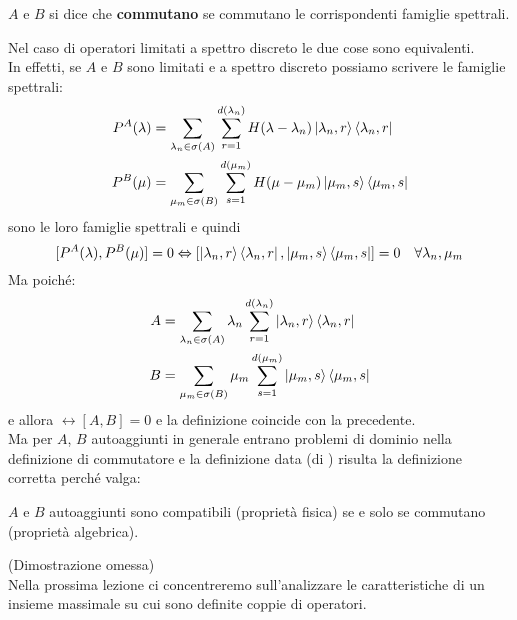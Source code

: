 \documentclass[../../FisicaTeorica.tex]{subfiles}
\begin{document}
\begin{dfn}
$A$ e $B$ si dice che \textbf{commutano} se commutano le corrispondenti famiglie spettrali. 
\end{dfn}
Nel caso di operatori limitati a spettro discreto le due cose sono equivalenti.\\
In effetti, se $A$ e $B$ sono limitati e a spettro discreto possiamo scrivere le famiglie spettrali:
\begin{align*}
P^A(\lambda) &= \sum_{\lambda_n \in \sigma(A)}\sum_{r=1}^{d(\lambda_n)}H(\lambda-\lambda_n)\ket{\lambda_n,r}\bra{\lambda_n, r}\\
P^B(\mu) &= \sum_{\mu_m \in \sigma(B)}\sum_{s=1}^{d(\mu_m)}H(\mu-\mu_m)\ket{\mu_m, s}\bra{\mu_m, s}
\end{align*}
sono le loro famiglie spettrali e quindi 
\[
[P^A(\lambda), P^B(\mu)]=0 \Leftrightarrow [\ket{\lambda_n,r}\bra{\lambda_n, r}, \ket{\mu_m, s}\bra{\mu_m, s}] = 0 \quad \forall \lambda_n, \mu_m
\]
Ma poiché:
\begin{align*}
A &= \sum_{\lambda_n \in \sigma(A)}\lambda_n \sum_{r=1}^{d(\lambda_n)}\ket{\lambda_n,r}\bra{\lambda_n,r}\\
B &= \sum_{\mu_m \in \sigma(B)} \mu_m \sum_{s=1}^{d(\mu_m)}\ket{\mu_m, s}\bra{\mu_m, s}
\end{align*}
e allora $\leftrightarrow [A,B]=0$ e la definizione coincide con la precedente.\\
Ma per $A$, $B$ autoaggiunti in generale entrano problemi di dominio nella definizione di commutatore e la definizione data (di ) risulta la definizione corretta  perché valga:
 \begin{thm}
 $A$ e $B$ autoaggiunti sono compatibili (proprietà fisica) se e solo se commutano (proprietà algebrica).
 \end{thm}
 (Dimostrazione omessa)\\
 
 Nella prossima lezione ci concentreremo sull'analizzare le caratteristiche di un insieme massimale su cui sono definite coppie di operatori.
\end{document}
